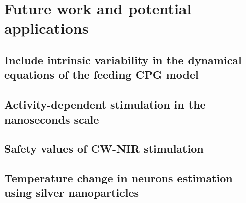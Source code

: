 \chapter{Future work and potential applications}
\label{c-recommendation}

\section{Include intrinsic variability in the dynamical equations of the feeding CPG model}

\section{Activity-dependent stimulation in the nanoseconds scale}

\section{Safety values of CW-NIR stimulation}

\section{Temperature change in neurons estimation using silver nanoparticles}
